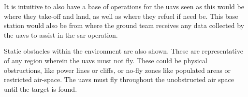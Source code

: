 It is intuitive to also have a base of operations for the \acp{uav} seen as this would be where they take-off and land, as well as where they refuel if need be. This base station would also be from where the ground team receives any data collected by the \acp{uav} to assist in the \ac{sar} operation.

Static obstacles within the environment are also shown. These are representative of any region wherein the \acp{uav} must not fly. These could be physical obstructions, like power lines or cliffs, or no-fly zones like populated areas or restricted air-space. The \acp{uav} must fly throughout the unobstructed air space until the target is found.
\begin{figure}[h!]
	\centering
	\begin{tikzpicture}[x=0.75pt,y=0.75pt,yscale=-0.83,xscale=0.83]
		

\end{tikzpicture}
\end{figure}

